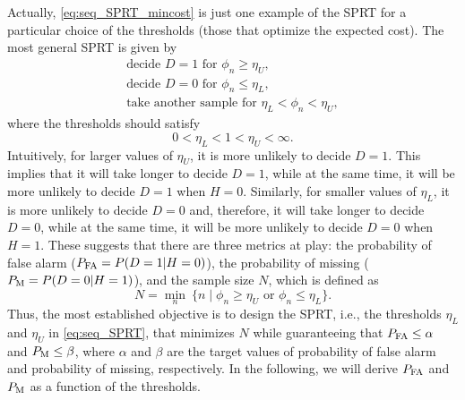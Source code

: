 Actually, \eqref{eq:seq_SPRT_mincost} is just one example of the SPRT for a particular choice of the thresholds (those that optimize the expected cost). The most general SPRT is given by
\begin{equation}
	\label{eq:seq_SPRT}
	\begin{array}{l}
		\text{decide } D = 1 \text{ for } \phi_n \geq \eta_U, \\
		\text{decide } D = 0 \text{ for } \phi_n \leq  \eta_L, \\
		\text{take another sample for } \eta_L < \phi_n < \eta_U,
	\end{array}
\end{equation}
where the thresholds should satisfy
\begin{equation*}
	0 < \eta_L < 1 < \eta_U < \infty.
\end{equation*}
Intuitively, for larger values of $\eta_U$, it is more unlikely to decide $D = 1$. This implies that it will take longer to decide $D = 1$, while at the same time, it will be more unlikely to decide $D = 1$ when $H = 0$. Similarly, for smaller values of $\eta_L$, it is more unlikely to decide $D = 0$ and, therefore, it will take longer to decide $D = 0$, while at the same time, it will be more unlikely to decide $D = 0$ when $H = 1$. These suggests that there are three metrics at play: the probability of false alarm ($P_{\text{FA}} = P(D = 1 | H = 0)$), the probability of missing ($P_{\text{M}} = P(D = 0 | H = 1)$), and the sample size $N$, which is defined as
\begin{equation*}
	\label{eq:sample_size}
	N =  \min_{n} \ \{n \mid \phi_n \geq \eta_U \text{ or } \phi_n \leq \eta_L\}. 
\end{equation*}
Thus,  the most established objective is to design the SPRT, i.e., the thresholds $\eta_L$ and $\eta_U$ in \eqref{eq:seq_SPRT}, that minimizes $N$ while guaranteeing that $P_{\text{FA}} \leq \alpha$ and $P_{\text{M}} \leq \beta$, where $\alpha$ and $\beta$ are the target values of probability of false alarm and probability of missing, respectively. In the following, we will derive $P_{\text{FA}}$ and $P_{\text{M}}$ as a function of the thresholds.

